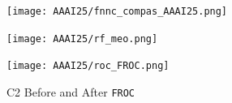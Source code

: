 \documentclass{article}
\newcommand{\ouralgo}{\texttt{FROC}}
\begin{document}




%     
%     


\begin{figure}
    \centering
    \hspace{-2cm}
    \begin{minipage}{0.3\linewidth}
         \centering
         \texttt{[image: AAAI25/fnnc\_compas\_AAAI25.png]}
         \caption{C1  vs. C1-\ouralgo}
        \label{fig:COMPAS_acc}
     \end{minipage}
     \begin{minipage}{0.3\linewidth}
         \centering
        \texttt{[image: AAAI25/rf\_meo.png]}
    \caption{C3-Fair Fair vs. C3-\ouralgo}
    \label{fig:FairProj} 
     \end{minipage}
     \begin{minipage}{0.3\linewidth}
         \centering
         \texttt{[image: AAAI25/roc\_FROC.png]}
   \caption{C2 Before and After \ouralgo}
    \label{fig:roc_froc}
     \end{minipage}
        \label{fig:three graphs}
\end{figure}
\end{document}
